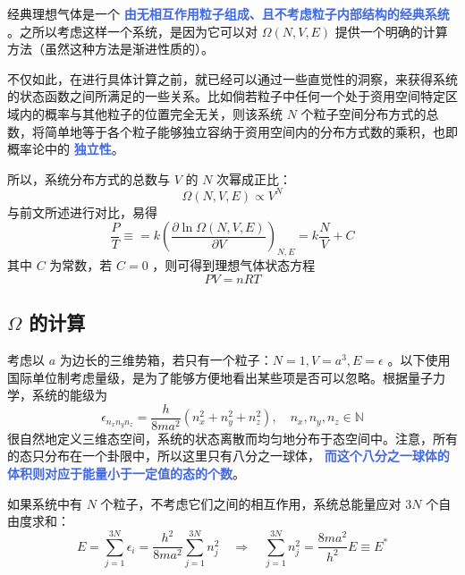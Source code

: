 经典理想气体是一个 \textcolor{RoyalBlue}{\textbf{\kaishu 由无相互作用粒子组成、且不考虑粒子内部结构的经典系统}} 。之所以考虑这样一个系统，是因为它可以对 $\Omega(N,V,E)$ 提供一个明确的计算方法（虽然这种方法是渐进性质的）。 

不仅如此，在进行具体计算之前，就已经可以通过一些直觉性的洞察，来获得系统的状态函数之间所满足的一些关系。比如倘若粒子中任何一个处于资用空间特定区域内的概率与其他粒子的位置完全无关，则该系统  $N$ 个粒子空间分布方式的总数，将简单地等于各个粒子能够独立容纳于资用空间内的分布方式数的乘积，也即概率论中的 \textcolor{RoyalBlue}{\textbf{\kaishu 独立性}}。

所以，系统分布方式的总数与 $V$ 的 $N$ 次幂成正比：
\begin{equation}
    \Omega(N,V,E) \propto V^N
\end{equation}
与前文所述进行对比，易得
\begin{equation}
    \frac{P}{T} \equiv = k \left(\frac{\partial \ln\Omega(N,V,E)}{\partial V}\right)_{N,E} = k\frac{N}{V} + C
\end{equation}
其中 $C$ 为常数，若 $C= 0$ ，则可得到理想气体状态方程
\begin{equation}
    PV = nRT
\end{equation}

\subsection{$\Omega$ 的计算}

考虑以 $a$ 为边长的三维势箱，若只有一个粒子：$N =1,V = a^3, E = \epsilon$ 。以下使用国际单位制考虑量级，是为了能够方便地看出某些项是否可以忽略。根据量子力学，系统的能级为
\begin{equation}
    \epsilon_{n_xn_yn_z} = \frac{h}{8ma^2} (n_x^2 + n_y^2 + n_z^2), \quad n_x, n_y, n_z\in \mathbb{N}
\end{equation}
很自然地定义三维态空间，系统的状态离散而均匀地分布于态空间中。注意，所有的态只分布在一个卦限中，所以这里只有八分之一球体， \textcolor{RoyalBlue}{\textbf{\kaishu  而这个八分之一球体的体积则对应于能量小于一定值的态的个数}}。

如果系统中有 $N$ 个粒子，不考虑它们之间的相互作用，系统总能量应对 $3N$ 个自由度求和：
\begin{equation}\label{equ:qiu}
    E = \sum_{j=1}^{3 N} \epsilon_i=\frac{ h^2}{8 m a^2} \sum_{j=1}^{3 N} n_j^2 \quad \Longrightarrow  \quad \sum_{j=1}^{3 N} n_j^2 = \frac{8ma^2}{h^2} E\equiv E^*
\end{equation}

